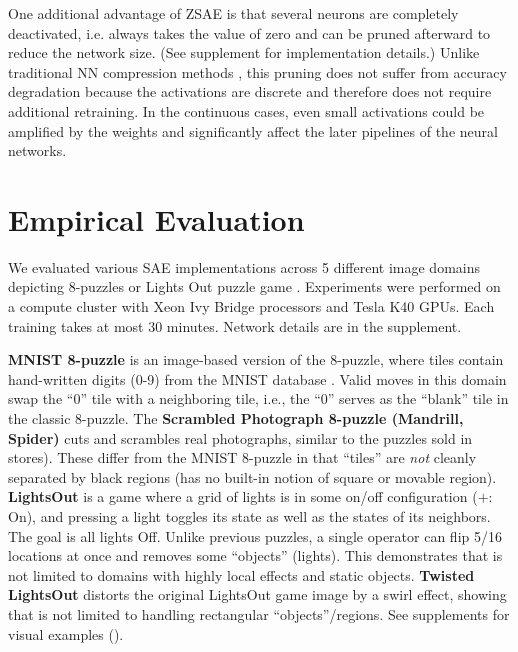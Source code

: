 
One additional advantage of ZSAE is that
several neurons are completely deactivated, i.e. always takes the value of zero
and can be pruned afterward to reduce the network size.
(See supplement  for implementation details.)
Unlike traditional NN compression methods \cite{cheng2017survey}, this pruning does not suffer from
accuracy degradation because the activations are discrete and therefore does not require additional retraining.
In the continuous cases, even small activations could be amplified by the weights and significantly affect the
later pipelines of the neural networks.

\section{Empirical Evaluation}
\label{evaluation}

We evaluated various SAE implementations across 5 different
image domains depicting 8-puzzles or Lights Out puzzle game \cite{lightsout}.
Experiments were performed on a compute cluster with Xeon Ivy Bridge
processors and Tesla K40 GPUs.  Each training takes at most 30 minutes.
Network details are in the supplement.

\textbf{MNIST 8-puzzle}
is an image-based version of the 8-puzzle, where tiles contain hand-written digits (0-9) from the  MNIST database \cite{lecun1998gradient}.
Valid moves in this domain swap the ``0'' tile  with a neighboring tile, i.e., the ``0'' serves as the ``blank'' tile in the classic 8-puzzle. 
The \textbf{Scrambled Photograph 8-puzzle (Mandrill, Spider)} cuts and scrambles real photographs, similar to the puzzles sold in stores).
These differ from the MNIST 8-puzzle in that ``tiles'' are \textit{not} cleanly separated by black regions
(\latentplanner has no built-in notion of square or movable region).
\textbf{LightsOut} is
a game where a grid of lights is in some on/off configuration ($+$: On),
and pressing a light toggles its state as well as the states of its neighbors.
The goal is all lights Off.
Unlike previous puzzles, a single operator can flip 5/16 locations at once and
removes some ``objects'' (lights).
This demonstrates that \latentplanner is not limited to domains with highly local effects and static objects.
\textbf{Twisted LightsOut} distorts the original LightsOut game image by a swirl effect,
showing that \latentplanner is not limited to handling rectangular ``objects''/regions.
See supplements for visual examples ().

